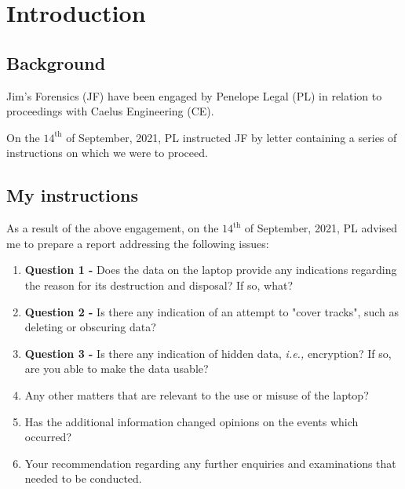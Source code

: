 \section{Introduction} %
\label{sec:introduction}

\subsection{Background} %
\label{sub:background}

\begin{myenum}
    \item Jim's Forensics (JF) have been engaged by Penelope Legal (PL) in relation to proceedings with Caelus Engineering (CE).
    \item On the $14^\text{th}$ of September, 2021, PL instructed JF by letter containing a series of instructions on which we were to proceed.
\end{myenum}


\subsection{My instructions} %
\label{sub:my_instructions}

\begin{myenum}
\item As a result of the above engagement, on the $14^\text{th}$ of September, 2021, PL advised me to prepare a report addressing the following issues:
    \begin{enumerate}
        \item \textbf{Question 1 -} Does the data on the laptop provide any indications regarding the reason for its destruction and disposal? If so, what?
        \item \textbf{Question 2 -} Is there any indication of an attempt to "cover tracks", such as deleting or obscuring data?
        \item \textbf{Question 3 - } Is there any indication of hidden data, \emph{i.e.,} encryption? If so, are you able to make the data usable?
        \item Any other matters that are relevant to the use or misuse of the laptop?
        \item Has the additional information changed opinions on the events which occurred?
        \item Your recommendation regarding any further enquiries and examinations that needed to be conducted.
    \end{enumerate}
\end{myenum}

